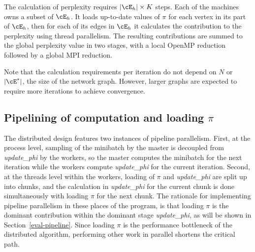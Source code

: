 The calculation of perplexity requires $|\cE_h|\times K$ steps. Each of the
machines owns a subset of $\cE_h$. It loads up-to-date values of $\pi$ for each
vertex in its part of $\cE_h$, then for each of its edges in $\cE_h$ it calculates the
contribution to the perplexity using thread parallelism. The resulting
contributions are summed to the global perplexity value in two stages,
with a local OpenMP reduction followed by a global MPI reduction.

Note that the calculation requirements per iteration do not depend
on $N$ or $|\cE^*|$, the size of the network graph. However, larger graphs are
expected to require more iterations to achieve convergence.

\subsection{Pipelining of computation and loading $\pi$}

The distributed design features two instances of pipeline parallelism. First,
at the process level, sampling of the minibatch by the master is decoupled
from \textit{update\_phi} by the workers, so the master computes the minibatch
for the next iteration while the workers compute \textit{update\_phi} for the
current iteration. Second, at the threads level within the workers, loading of
$\pi$ and \textit{update\_phi} are split up into chunks, and the calculation
in \textit{update\_phi} for the current chunk is done simultaneously with
loading $\pi$ for the next chunk. The rationale for implementing pipeline
parallelism in these places of the program, is that loading $\pi$ is the
dominant contribution within the dominant stage \textit{update\_phi}, as
will be shown in Section~\ref{eval-pipeline}.  Since loading $\pi$ is the
performance bottleneck of the distributed algorithm, performing other work
in parallel shortens the critical path.
